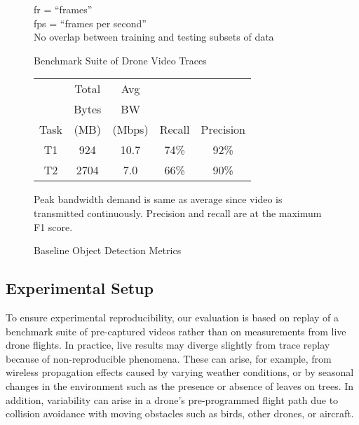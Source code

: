 \begin{figure}
\begin{tabular}{|p{1cm}|p{2.5cm}|p{2.5cm}|p{2.5cm}|p{2.5cm}|p{2.5cm}|}
\hline
\end{tabular}
\vspace{0.1in}
\begin{captiontext}
fr = ``frames''\\
fps = ``frames per second''\\
No overlap between training and testing subsets of data
\end{captiontext}
\caption{Benchmark Suite of Drone Video Traces}
\label{fig:benchmarksuite}
\end{figure}

\begin{figure}
\centering
\begin{tabular}{|c|c|c|c|c|}
\hline
     & Total & Avg & & \\ 
     & Bytes & BW & & \\ 
Task & (MB) & (Mbps) & Recall & Precision \\ 

\hline
T1 & \phantom{0}924 & 10.7 & 74\% & 92\%\\ 
\hline
T2 & 2704 & \phantom{0}7.0 & 66\% & 90\%\\ 
\hline
\end{tabular}
\vspace{0.2in}
\begin{captiontext}
Peak bandwidth demand is same as average since video is transmitted
continuously. Precision and recall are at the maximum F1 score.
\end{captiontext}
\caption{Baseline Object Detection Metrics}
\label{fig:baseline}
\end{figure}

\subsection{Experimental Setup}
\label{sec:dumbdrone-setup}

To ensure experimental reproducibility, our evaluation is based on
replay of a benchmark suite of pre-captured videos rather than on
measurements from live drone flights.  In practice, live results may
diverge slightly from trace replay because of non-reproducible
phenomena.  These can arise, for example, from wireless propagation
effects caused by varying weather conditions, or by seasonal changes
in the environment such as the presence or absence of leaves on trees.
In addition, variability can arise in a  drone's pre-programmed flight
path due to collision avoidance with moving obstacles such as birds,
other drones, or aircraft.

